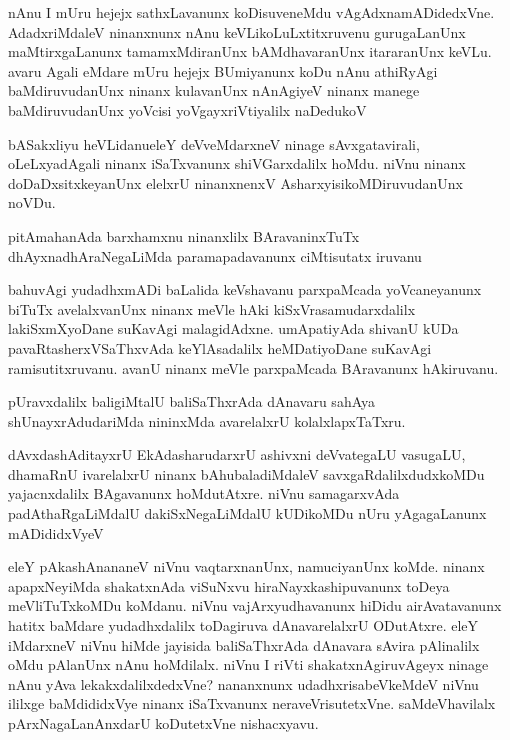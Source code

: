 \begin{mng}
nAnu I mUru hejejx sathxLavanunx koDisuveneMdu vAgAdxnamADidedxVne. AdadxriMdaleV ninanxnunx nAnu keVLikoLuLxtitxruvenu gurugaLanUnx maMtirxgaLanunx tamamxMdiranUnx bAMdhavaranUnx itararanUnx keVLu. avaru Agali eMdare mUru hejejx BUmiyanunx koDu nAnu athiRyAgi baMdiruvudanUnx ninanx kulavanUnx nAnAgiyeV ninanx manege baMdiruvudanUnx yoVcisi yoVgayxriVtiyalilx naDedukoV
\end{mng}

\begin{mng}
bASakxliyu heVLidanu\mdash eleY deVveMdarxneV ninage sAvxgatavirali, oLeLxyadAgali ninanx iSaTxvanunx shiVGarxdalilx hoMdu.  niVnu ninanx doDaDxsitxkeyanUnx elelxrU ninanxnenxV AsharxyisikoMDiruvudanUnx noVDu.
\end{mng}

\begin{mng}
pitAmahanAda barxhamxnu ninanxlilx BAravaninxTuTx dhAyxnadhAraNegaLiMda paramapadavanunx ciMtisutatx iruvanu
\end{mng}

\begin{mng}
bahuvAgi yudadhxmADi baLalida keVshavanu parxpaMcada yoVcaneyanunx biTuTx avelalxvanUnx ninanx meVle hAki kiSxVrasamudarxdalilx lakiSxmXyoDane suKavAgi malagidAdxne. umApatiyAda shivanU kUDa pavaRtasherxVSaThxvAda keYlAsadalilx heMDatiyoDane suKavAgi ramisutitxruvanu. avanU ninanx meVle parxpaMcada BAravanunx hAkiruvanu.
\end{mng}

\begin{mng}
pUravxdalilx baligiMtalU baliSaThxrAda dAnavaru sahAya shUnayxrAdudariMda nininxMda avarelalxrU kolalxlapxTaTxru.
\end{mng}

\begin{mng}
dAvxdashAditayxrU EkAdasharudarxrU ashivxni deVvategaLU vasugaLU, dhamaRnU ivarelalxrU ninanx bAhubaladiMdaleV savxgaRdalilxdudxkoMDu yajacnxdalilx BAgavanunx hoMdutAtxre. niVnu samagarxvAda padAthaRgaLiMdalU dakiSxNegaLiMdalU kUDikoMDu nUru yAgagaLanunx mADididxVyeV
\end{mng}

\begin{mng}
eleY pAkashAnananeV niVnu vaqtarxnanUnx, namuciyanUnx koMde. ninanx apapxNeyiMda shakatxnAda viSuNxvu hiraNayxkashipuvanunx toDeya meVliTuTxkoMDu koMdanu. niVnu vajArxyudhavanunx hiDidu airAvatavanunx hatitx baMdare yudadhxdalilx toDagiruva dAnavarelalxrU ODutAtxre. eleY iMdarxneV niVnu hiMde jayisida baliSaThxrAda dAnavara sAvira pAlinalilx oMdu pAlanUnx nAnu hoMdilalx. niVnu I riVti shakatxnAgiruvAgeyx ninage nAnu yAva lekakxdalilxdedxVne? nananxnunx udadhxrisabeVkeMdeV niVnu ililxge baMdididxVye ninanx iSaTxvanunx neraveVrisutetxVne. saMdeVhavilalx pArxNagaLanAnxdarU koDutetxVne nishacxyavu.
\end{mng}

